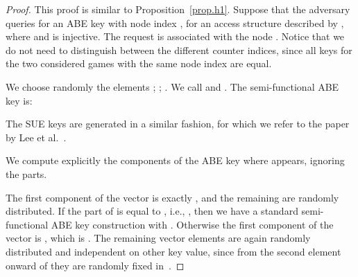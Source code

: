 \documentclass[a4paper,10pt]{article}
\newcommand{\randomchoose}[1]{We choose randomly the element\ifstrequal{#1}{s}{}{s} }
\newcommand{\disclaimerSUE}{The SUE keys are generated in a similar fashion, for which we refer to the paper by Lee et al.~\cite{lee2013RSABE}.

}
\begin{document}
	\begin{proof}
		This proof is similar to Proposition~\ref{prop.h1}.
		Suppose that the adversary queries for an ABE key with node index , for an access structure described by , where  and  is injective. The request is associated with the node . Notice that we do not need to distinguish between the different counter indices, since all keys for the two considered games with the same node index are equal.
		
		\randomchoose{p}{;
			\linebreak;
			.
		}		
		We call  and .		
		The semi-functional ABE key is:
				
		\disclaimerSUE{}
We compute explicitly the components of the ABE key where  appears, ignoring the  parts.
		
		The first component of the vector  is exactly , and the remaining are randomly distributed. If the  part of  is equal to , i.e., , then we have a standard semi-functional ABE key construction with . Otherwise the first component of the vector  is , which is . The remaining vector elements are again randomly distributed and independent on other key value, since from the second element onward of  they are randomly fixed in~.
		
\end{proof}
\end{document}
